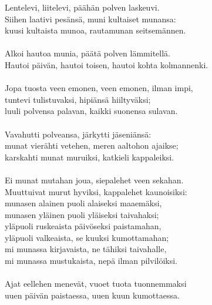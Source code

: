 Lentelevi, liitelevi, päähän polven laskeuvi.               \\
Siihen laativi pesänsä, muni kultaiset munansa:             \\
kuusi kultaista munoa, rautamunan seitsemännen.             \\
                                                            \\
Alkoi hautoa munia, päätä polven lämmitellä.                \\
Hautoi päivän, hautoi toisen, hautoi kohta kolmannenki.     \\
                                                            \\
Jopa tuosta veen emonen, veen emonen, ilman impi,           \\
tuntevi tulistuvaksi, hipiänsä hiiltyväksi;                 \\
luuli polvensa palavan, kaikki suonensa sulavan.            \\
                                                            \\
Vavahutti polveansa, järkytti jäseniänsä:                   \\
munat vierähti vetehen, meren aaltohon ajaikse;             \\
karskahti munat muruiksi, katkieli kappaleiksi.             \\
                                                            \\
Ei munat mutahan joua, siepalehet veen sekahan.             \\
Muuttuivat murut hyviksi, kappalehet kaunoisiksi:           \\
munasen alainen puoli alaiseksi maaemäksi,                  \\
munasen yläinen puoli yläiseksi taivahaksi;                 \\
yläpuoli ruskeaista päivöseksi paistamahan,                 \\
yläpuoli valkeaista, se kuuksi kumottamahan;                \\
mi munassa kirjavaista, ne tähiksi taivahalle,              \\
mi munassa mustukaista, nepä ilman pilvilöiksi.             \\
                                                            \\
Ajat eellehen menevät, vuoet tuota tuonnemmaksi             \\
uuen päivän paistaessa, uuen kuun kumottaessa.              \\
